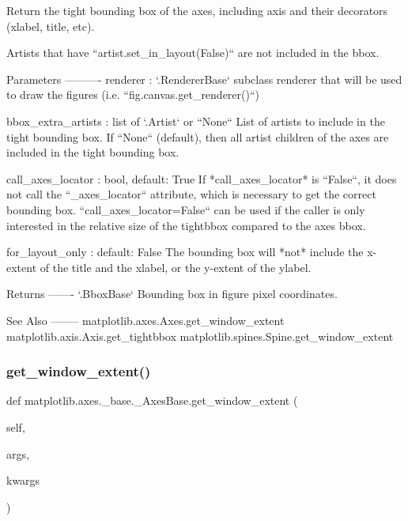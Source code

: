 \begin{DoxyVerb}Return the tight bounding box of the axes, including axis and their
decorators (xlabel, title, etc).

Artists that have ``artist.set_in_layout(False)`` are not included
in the bbox.

Parameters
----------
renderer : `.RendererBase` subclass
    renderer that will be used to draw the figures (i.e.
    ``fig.canvas.get_renderer()``)

bbox_extra_artists : list of `.Artist` or ``None``
    List of artists to include in the tight bounding box.  If
    ``None`` (default), then all artist children of the axes are
    included in the tight bounding box.

call_axes_locator : bool, default: True
    If *call_axes_locator* is ``False``, it does not call the
    ``_axes_locator`` attribute, which is necessary to get the correct
    bounding box. ``call_axes_locator=False`` can be used if the
    caller is only interested in the relative size of the tightbbox
    compared to the axes bbox.

for_layout_only : default: False
    The bounding box will *not* include the x-extent of the title and
    the xlabel, or the y-extent of the ylabel.

Returns
-------
`.BboxBase`
    Bounding box in figure pixel coordinates.

See Also
--------
matplotlib.axes.Axes.get_window_extent
matplotlib.axis.Axis.get_tightbbox
matplotlib.spines.Spine.get_window_extent
\end{DoxyVerb}
 \mbox{\label{classmatplotlib_1_1axes_1_1__base_1_1__AxesBase_a16885d6b7a1b64a1bbee17f29630c8d7}} 
\subsubsection{\texorpdfstring{get\+\_\+window\+\_\+extent()}{get\_window\_extent()}}
{\footnotesize\ttfamily def matplotlib.\+axes.\+\_\+base.\+\_\+\+Axes\+Base.\+get\+\_\+window\+\_\+extent (\begin{DoxyParamCaption}\item[{}]{self,  }\item[{}]{args,  }\item[{}]{kwargs }\end{DoxyParamCaption})}

